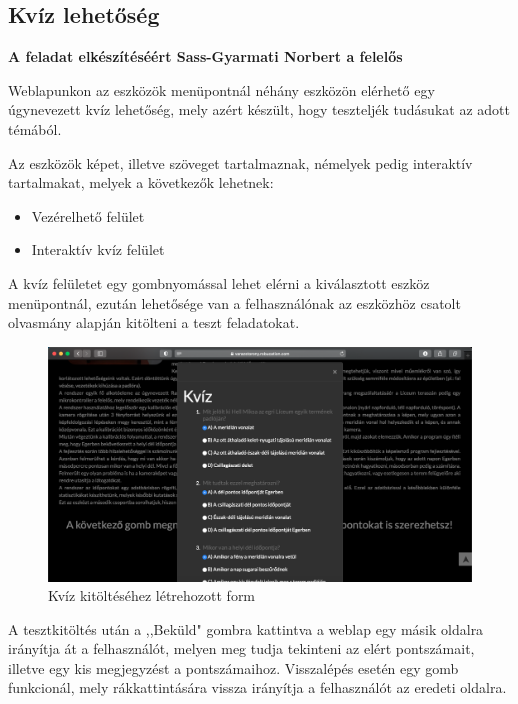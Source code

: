 \documentclass[
]{thesis-ekf}
\theoremstyle{definition}
\theoremstyle{remark}
\begin{document}
		\subsection{Kvíz lehetőség}
			\textbf{A feladat elkészítéséért Sass-Gyarmati Norbert a felelős}
			\par Weblapunkon az eszközök menüpontnál néhány eszközön elérhető egy úgynevezett kvíz lehetőség, mely azért készült, hogy teszteljék tudásukat az adott témából. 
			\par Az eszközök képet, illetve szöveget tartalmaznak, némelyek pedig interaktív tartalmakat, melyek a következők lehetnek:
			\begin{itemize}
				\item Vezérelhető felület
				\item Interaktív kvíz felület
			\end{itemize}
			\par A kvíz felületet egy gombnyomással lehet elérni a kiválasztott eszköz menüpontnál, ezután lehetősége van a felhasználónak az eszközhöz csatolt olvasmány alapján kitölteni a teszt feladatokat. 
			\begin{figure}[h]
				\centering
				\includegraphics[scale=0.30]{./images/quiztest}
				\caption{Kvíz kitöltéséhez létrehozott form}
				\label{fig:test}
			\end{figure}
			\par A tesztkitöltés után a ,,Beküld" gombra kattintva a weblap egy másik oldalra irányítja át a felhasználót, melyen meg tudja tekinteni az elért pontszámait, illetve egy kis megjegyzést a pontszámaihoz. Visszalépés esetén egy gomb funkcionál, mely rákkattintására vissza irányítja a felhasználót az eredeti oldalra.	
\end{document}
